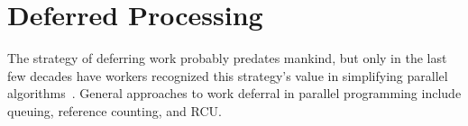 
\chapter{Deferred Processing}
\label{chp:defer:Deferred Processing}


The strategy of deferring work probably predates mankind, but only
in the last few decades have workers recognized this strategy's value
in simplifying parallel algorithms~\cite{Kung80,HMassalinPhD}.
General approaches to work deferral in parallel programming include
queuing, reference counting, and RCU.



